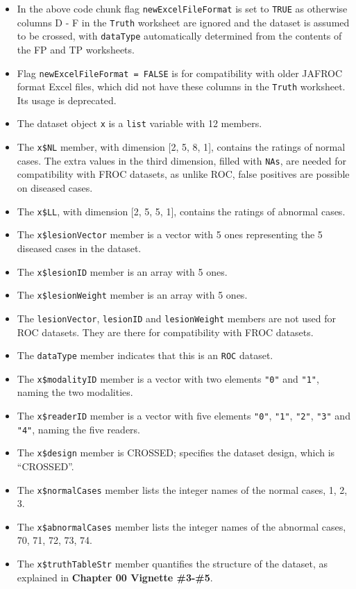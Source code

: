 \documentclass[
]{book}
\providecommand{\tightlist}{%
  \setlength{\itemsep}{0pt}\setlength{\parskip}{0pt}}
\begin{document}
\begin{itemize}
\tightlist
\item
  In the above code chunk flag \texttt{newExcelFileFormat} is set to \texttt{TRUE} as otherwise columns D - F in the \texttt{Truth} worksheet are ignored and the dataset is assumed to be crossed, with \texttt{dataType} automatically determined from the contents of the FP and TP worksheets.
\item
  Flag \texttt{newExcelFileFormat\ =\ FALSE} is for compatibility with older JAFROC format Excel files, which did not have these columns in the \texttt{Truth} worksheet. Its usage is deprecated.
\item
  The dataset object \texttt{x} is a \texttt{list} variable with 12 members.
\item
  The \texttt{x\$NL} member, with dimension {[}2, 5, 8, 1{]}, contains the ratings of normal cases. The extra values in the third dimension, filled with \texttt{NAs}, are needed for compatibility with FROC datasets, as unlike ROC, false positives are possible on diseased cases.
\item
  The \texttt{x\$LL}, with dimension {[}2, 5, 5, 1{]}, contains the ratings of abnormal cases.
\item
  The \texttt{x\$lesionVector} member is a vector with 5 ones representing the 5 diseased cases in the dataset.
\item
  The \texttt{x\$lesionID} member is an array with 5 ones.
\item
  The \texttt{x\$lesionWeight} member is an array with 5 ones.
\item
  The \texttt{lesionVector}, \texttt{lesionID} and \texttt{lesionWeight} members are not used for ROC datasets. They are there for compatibility with FROC datasets.
\item
  The \texttt{dataType} member indicates that this is an \texttt{ROC} dataset.
\item
  The \texttt{x\$modalityID} member is a vector with two elements \texttt{"0"} and \texttt{"1"}, naming the two modalities.
\item
  The \texttt{x\$readerID} member is a vector with five elements \texttt{"0"}, \texttt{"1"}, \texttt{"2"}, \texttt{"3"} and \texttt{"4"}, naming the five readers.
\item
  The \texttt{x\$design} member is CROSSED; specifies the dataset design, which is ``CROSSED''.
\item
  The \texttt{x\$normalCases} member lists the integer names of the normal cases, 1, 2, 3.
\item
  The \texttt{x\$abnormalCases} member lists the integer names of the abnormal cases, 70, 71, 72, 73, 74.
\item
  The \texttt{x\$truthTableStr} member quantifies the structure of the dataset, as explained in \textbf{Chapter 00 Vignette \#3-\#5}.
\end{itemize}
\end{document}
